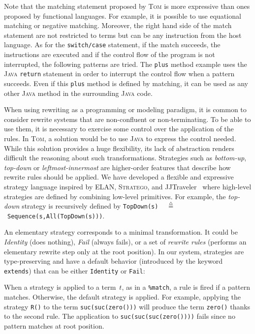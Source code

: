 \documentclass[runningheads]{llncs}
\newcommand{\stratego}{\textsc{Stratego}}
\newcommand{\jjtraveler}{{JJTraveler}}
\newcommand{\elan}    {\textsf{ELAN}\xspace}
\newcommand{\tom}{\textsc{Tom}}
\newcommand{\java}{\textsc{Java}}
\newcommand{\isdef}{\mathrel{\mbox{\small$\stackrel{\mbox{\tiny$\triangle$}}{=}$}}}
\begin{document}
Note that the matching statement proposed by {\tom} is more expressive than
ones proposed by functional languages. For example,  it is possible to use
equational matching or negative matching. Moreover, the right hand side of the
match statement are not restricted to terms but can be any instruction from the
host language. As for the \texttt{switch/case} statement, if the match
succeeds, the instructions are executed and if the control flow of the program
is not interrupted, the following patterns are tried. The \texttt{plus} method
example uses the {\java} \texttt{return} statement in order to interrupt the
control flow when a pattern succeeds. Even if this \texttt{plus} method is
defined by matching, it can be used as any other {\java} method in the
surrounding {\java} code. 

When using rewriting as a programming or modeling paradigm, it is common to
consider rewrite systems that are non-confluent or non-terminating. To be able
to use them, it is necessary to exercise some control over the application of
the rules. In {\tom}, a solution would be to use {\java} to express the control
needed. While this solution provides a huge flexibility, its lack of
abstraction renders difficult the reasoning about such transformations.
Strategies such as \emph{bottom-up}, \emph{top-down} or \emph{leftmost-innermost}
are higher-order features that describe how rewrite rules should be applied.
We have developed a flexible and expressive strategy language inspired by
{\elan}, {\stratego}, and {\jjtraveler}~\cite{visser-oopsla01} where high-level
strategies are defined by combining low-level primitives. For example, the
\emph{top-down} strategy is recursively defined by
\texttt{TopDown(s)}~${\isdef}$~\texttt{Sequence(s,All(TopDown(s)))}.

An elementary strategy corresponds to a minimal transformation. It could be
\emph{Identity} (does nothing), \emph{Fail} (always fails), or a set of
\emph{rewrite rules} (performs an elementary rewrite step only at the root
position).  In our system, strategies are type-preserving and have a default
behavior (introduced by the keyword \texttt{extends}) that can be either
\texttt{Identity} or \texttt{Fail}:


When a strategy is applied to a term~$t$, as in a \texttt{\%match}, a rule is
fired if a pattern matches. Otherwise, the default strategy is applied.
For example, applying the strategy \texttt{R()} to the term
\texttt{suc(suc(zero()))} will produce the term \texttt{zero()} thanks to the
second rule. The application to \texttt{suc(suc(suc(zero())))} fails since no
pattern matches at root position.
\end{document}
